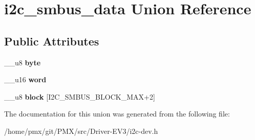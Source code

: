 \hypertarget{unioni2c__smbus__data}{}\section{i2c\+\_\+smbus\+\_\+data Union Reference}
\label{unioni2c__smbus__data}
\subsection*{Public Attributes}
\begin{DoxyCompactItemize}
\item 
\mbox{\label{unioni2c__smbus__data_aa0e2604ac3df1abcfe68c95c8d1d8f5b}} 
\+\_\+\+\_\+u8 {\bfseries byte}
\item 
\mbox{\label{unioni2c__smbus__data_adcbf2a0d0c112b6a77b35b3125f15e77}} 
\+\_\+\+\_\+u16 {\bfseries word}
\item 
\mbox{\label{unioni2c__smbus__data_af0c92c143c24c0c49902f705a1ebe65c}} 
\+\_\+\+\_\+u8 {\bfseries block} \mbox{[}I2\+C\+\_\+\+S\+M\+B\+U\+S\+\_\+\+B\+L\+O\+C\+K\+\_\+\+M\+AX+2\mbox{]}
\end{DoxyCompactItemize}


The documentation for this union was generated from the following file\+:\begin{DoxyCompactItemize}
\item 
/home/pmx/git/\+P\+M\+X/src/\+Driver-\/\+E\+V3/i2c-\/dev.\+h\end{DoxyCompactItemize}
